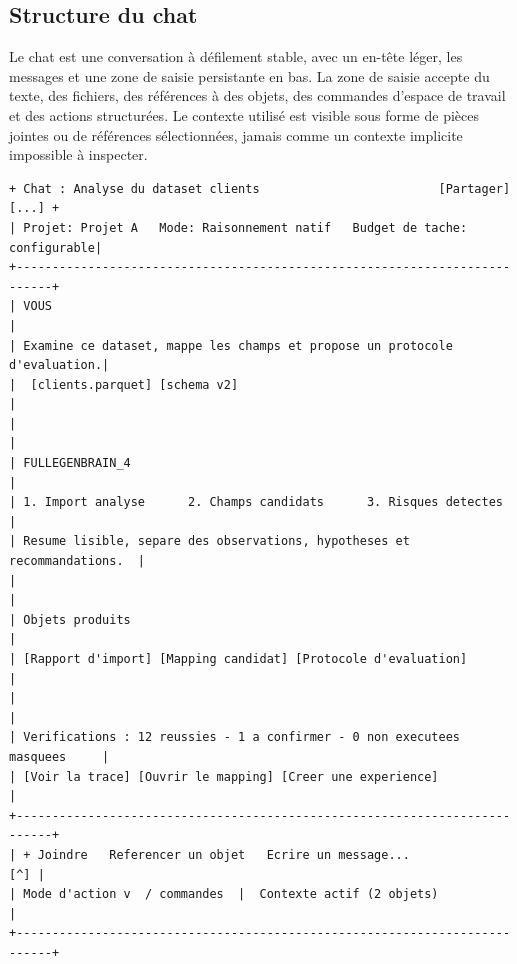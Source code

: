 \documentclass[11pt,a4paper]{article}
\begin{document}
\subsection{Structure du chat}
Le chat est une conversation à défilement stable, avec un en-tête léger, les messages et une zone de saisie persistante en bas. La zone de saisie accepte du texte, des fichiers, des références à des objets, des commandes d'espace de travail et des actions structurées. Le contexte utilisé est visible sous forme de pièces jointes ou de références sélectionnées, jamais comme un contexte implicite impossible à inspecter.

\begin{lstlisting}
+ Chat : Analyse du dataset clients                         [Partager] [...] +
| Projet: Projet A   Mode: Raisonnement natif   Budget de tache: configurable|
+---------------------------------------------------------------------------+
| VOUS                                                                     |
| Examine ce dataset, mappe les champs et propose un protocole d'evaluation.|
|  [clients.parquet] [schema v2]                                           |
|                                                                           |
| FULLEGENBRAIN_4                                                          |
| 1. Import analyse      2. Champs candidats      3. Risques detectes       |
| Resume lisible, separe des observations, hypotheses et recommandations.  |
|                                                                           |
| Objets produits                                                            |
| [Rapport d'import] [Mapping candidat] [Protocole d'evaluation]             |
|                                                                           |
| Verifications : 12 reussies - 1 a confirmer - 0 non executees masquees     |
| [Voir la trace] [Ouvrir le mapping] [Creer une experience]                |
+---------------------------------------------------------------------------+
| + Joindre   Referencer un objet   Ecrire un message...                 [^] |
| Mode d'action v  / commandes  |  Contexte actif (2 objets)                 |
+---------------------------------------------------------------------------+
\end{lstlisting}
\end{document}
